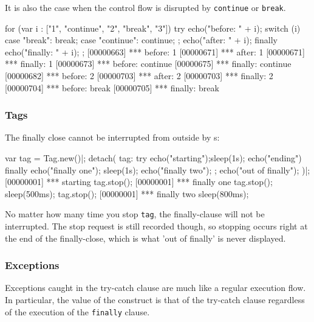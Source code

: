 It is also the case when the control flow is disrupted by
\lstinline{continue} or \lstinline{break}.

\begin{urbiscript}
for (var i : ["1", "continue", "2", "break", "3"])
  try
  {
    echo("before:  " + i);
    switch (i)
    {
      case "break":    break;
      case "continue": continue;
    };
    echo("after:   " + i);
  }
  finally
  {
    echo("finally: " + i);
  };
[00000663] *** before:  1
[00000671] *** after:   1
[00000671] *** finally: 1
[00000673] *** before:  continue
[00000675] *** finally: continue
[00000682] *** before:  2
[00000703] *** after:   2
[00000703] *** finally: 2
[00000704] *** before:  break
[00000705] *** finally: break
\end{urbiscript}

\subsubsection{Tags}

The finally close cannot be interrupted from outside by s:

\begin{urbiscript}

var tag = Tag.new()|;
detach({
  tag: {
    try {
      echo("starting");sleep(1s); echo("ending")
    }
    finally {
      echo("finally one");
      sleep(1s);
      echo("finally two");
    };
    echo("out of finally");
  }
})|;
[00000001] *** starting
tag.stop();
[00000001] *** finally one
tag.stop();
sleep(500ms);
tag.stop();
[00000001] *** finally two
sleep(800ms);

\end{urbiscript}

No matter how many time you stop \lstinline{tag}, the finally-clause will not be
interrupted. The stop request is still recorded though, so stopping occurs
right at the end of the finally-close, which is what 'out of finally' is
never displayed.

\subsubsection{Exceptions}

Exceptions caught in the try-catch clause are much like a regular execution
flow.  In particular, the value of the construct is that of the try-catch
clause regardless of the execution of the \lstinline{finally} clause.


